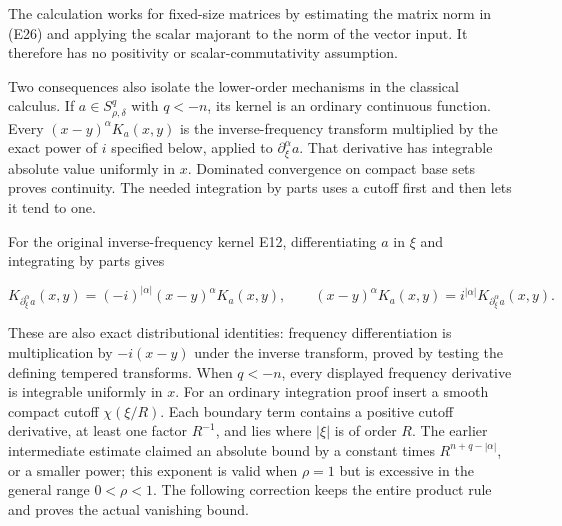 \documentclass[
  11pt,
]{article}
\begin{document}
The calculation works for fixed-size matrices by estimating the matrix
norm in (E26) and applying the scalar majorant to the norm of the vector
input. It therefore has no positivity or scalar-commutativity
assumption.

Two consequences also isolate the lower-order mechanisms in the
classical calculus. If \(a\in S^q_{\rho,\delta}\) with \(q<-n\), its
kernel is an ordinary continuous function. Every
\((x-y)^\alpha K_a(x,y)\) is the inverse-frequency transform multiplied
by the exact power of \(i\) specified below, applied to
\(\partial_\xi^\alpha a\). That derivative has integrable absolute value
uniformly in \(x\). Dominated convergence on compact base sets proves
continuity. The needed integration by parts uses a cutoff first and then
lets it tend to one.

For the original inverse-frequency kernel E12, differentiating \(a\) in
\(\xi\) and integrating by parts gives

\[
 K_{\partial_\xi^\alpha a}(x,y)
 =(-i)^{|\alpha|}(x-y)^\alpha K_a(x,y),\qquad
 (x-y)^\alpha K_a(x,y)
 =i^{|\alpha|}K_{\partial_\xi^\alpha a}(x,y).
 \tag{EC15}
\]

These are also exact distributional identities: frequency
differentiation is multiplication by \(-i(x-y)\) under the inverse
transform, proved by testing the defining tempered transforms. When
\(q<-n\), every displayed frequency derivative is integrable uniformly
in \(x\). For an ordinary integration proof insert a smooth compact
cutoff \(\chi(\xi/R)\). Each boundary term contains a positive cutoff
derivative, at least one factor \(R^{-1}\), and lies where \(|\xi|\) is
of order \(R\). The earlier intermediate estimate claimed an absolute
bound by a constant times \(R^{n+q-|\alpha|}\), or a smaller power; this
exponent is valid when \(\rho=1\) but is excessive in the general range
\(0<\rho<1\). The following correction keeps the entire product rule and
proves the actual vanishing bound.
\end{document}
